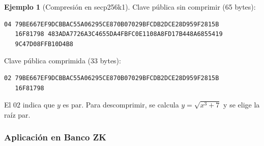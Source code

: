 \documentclass[11pt,a4paper,twoside,openright]{book}
\theoremstyle{definition}
\newtheorem{example}{Ejemplo}[chapter]
\theoremstyle{plain}
\theoremstyle{remark}
\begin{document}
\begin{example}[Compresión en secp256k1]
Clave pública sin comprimir (65 bytes):
\begin{verbatim}
04 79BE667EF9DCBBAC55A06295CE870B07029BFCDB2DCE28D959F2815B
   16F81798 483ADA7726A3C4655DA4FBFC0E1108A8FD17B448A6855419
   9C47D08FFB10D4B8
\end{verbatim}

Clave pública comprimida (33 bytes):
\begin{verbatim}
02 79BE667EF9DCBBAC55A06295CE870B07029BFCDB2DCE28D959F2815B
   16F81798
\end{verbatim}

El $02$ indica que $y$ es par. Para descomprimir, se calcula $y = \sqrt{x^3 + 7}$ y se elige la raíz par.
\end{example}

\subsubsection{Aplicación en Banco ZK}
\end{document}
